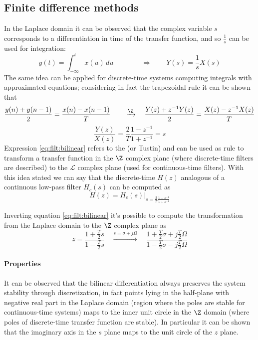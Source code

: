 \subsection{Finite difference methods}
	In the Laplace domain it can be observed that the complex variable $s$ corresponds to a differentiation in time of the transfer function, and so $\frac 1 s$ can be used for integration:
	\[ y(t) = \int_{-\infty}^t x(u)\, du \qquad \qquad \Rightarrow \qquad Y(s) = \frac 1 s X(s) \] 
	The same idea can be applied for discrete-time systems computing integrals with approximated equations; considering in fact the trapezoidal rule it can be shown that
	\[ \frac{y(n) + y(n-1)}{2} = \frac{x(n) - x(n-1)}{T} \qquad \xrightarrow{\Z} \quad \frac{Y(z) + z^{-1}Y(z)}{2} = \frac{X(z)-z^{-1} X(z)}{T}  \]
	\begin{equation} \label{eq:filt:bilinear}
		\frac{Y(z)}{X(z)} = \frac 2 T \frac{1 - z^{-1}}{1 + z^{-1} } = s
	\end{equation}
	Expression \ref{eq:filt:bilinear} refers to the  (or Tustin)  and can be used as rule to transform a transfer function in the $\Z$ complex plane (where discrete-time filters are described) to the $\mathscr L$ complex plane (used for continuous-time filters). With this idea stated we can say that the discrete-time $H(z)$ analogous of a continuous low-pass filter $H_c(s)$ can be computed as
	\begin{equation} \label{eq:filt:bilineartransfer}
		H(z) = H_c(s) \Big|_{s = \frac 2 T \frac{1 - z^{-1}}{1 + z^{-1} }}
	\end{equation}

	Inverting equation \ref{eq:filt:bilinear} it's possible to compute the transformation from the Laplace domain to the $\Z$ complex plane as
	\begin{equation}
		z = \frac{1 + \frac T2 s}{1 - \frac T2 s} \quad \xrightarrow{s = \sigma + j \Omega} \quad \frac{ 1 + \frac T 2 \sigma + j \frac T 2 \Omega}{1 - \frac T 2 \sigma - j \frac T 2 \Omega }
	\end{equation}
	
	\paragraph{Properties} It can be observed that the bilinear differentiation always preserves the system stability through discretization, in fact points lying in the half-plane with negative real part in the Laplace domain (region where the poles are stable for continuous-time systems) maps to the inner unit circle in the $\Z$ domain (where poles of discrete-time transfer function are stable). In particular it can be shown that the imaginary axis in the $s$ plane maps to the unit circle of the $z$ plane.
	
